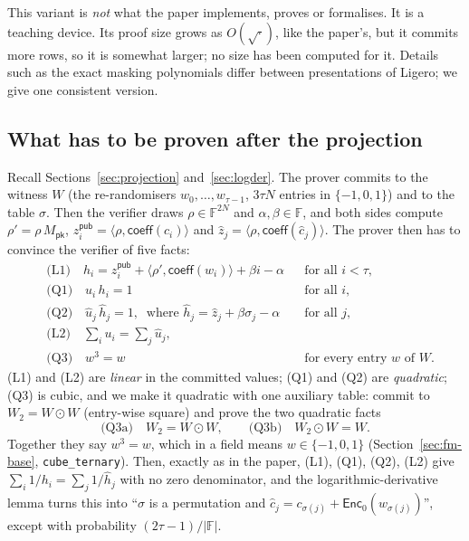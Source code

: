 \documentclass[11pt,a4paper]{article}
\newcommand{\F}{\mathbb{F}}
\newcommand{\EncZ}{\mathsf{Enc}_0}
\newcommand{\coeff}{\mathsf{coeff}}
\newcommand{\Mpk}{M_{\mathsf{pk}}}
\newcommand{\ip}[2]{\langle #1, #2\rangle}
\newcommand{\uh}{\hat{u}}
\newcommand{\hh}{\hat{h}}
\newcommand{\zh}{\hat{z}}
\newcommand{\ch}{\hat{c}}
\theoremstyle{definition}
\theoremstyle{plain}
\begin{document}
\begin{caution}[Status]
This variant is \emph{not} what the paper implements, proves or formalises. It is a teaching
device. Its proof size grows as $O(\sqrt{\cdot})$, like the paper's, but it commits more rows, so it
is somewhat larger; no size has been computed for it. Details such as the exact masking polynomials
differ between presentations of Ligero; we give one consistent version.
\end{caution}

\subsection{What has to be proven after the projection}

Recall Sections~\ref{sec:projection} and~\ref{sec:logder}. The prover commits to the witness $W$
(the re-randomisers $w_0,\dots,w_{\tau-1}$, $3\tau N$ entries in $\{-1,0,1\}$) and to the table
$\sigma$. Then the verifier draws $\rho\in\F^{2N}$ and $\alpha,\beta\in\F$, and both sides compute
$\rho'=\rho\,\Mpk$, $z^{\mathsf{pub}}_i=\ip{\rho}{\coeff(c_i)}$ and $\zh_j=\ip{\rho}{\coeff(\ch_j)}$.
The prover then has to convince the verifier of five facts:
\begin{align*}
  &\text{(L1)}\quad h_i = z^{\mathsf{pub}}_i+\ip{\rho'}{\coeff(w_i)}+\beta i-\alpha &&\text{for all } i<\tau,\\
  &\text{(Q1)}\quad u_i\,h_i=1 &&\text{for all } i,\\
  &\text{(Q2)}\quad \uh_j\,\hh_j=1,\ \text{ where }\hh_j=\zh_j+\beta\sigma_j-\alpha &&\text{for all } j,\\
  &\text{(L2)}\quad \textstyle\sum_iu_i=\sum_j\uh_j,\\
  &\text{(Q3)}\quad w^3=w &&\text{for every entry } w \text{ of } W.
\end{align*}
(L1) and (L2) are \emph{linear} in the committed values; (Q1) and (Q2) are \emph{quadratic}; (Q3)
is cubic, and we make it quadratic with one auxiliary table: commit to $W_2=W\odot W$ (entry-wise
square) and prove the two quadratic facts
\[
  \text{(Q3a)}\quad W_2=W\odot W,\qquad \text{(Q3b)}\quad W_2\odot W=W .
\]
Together they say $w^3=w$, which in a field means $w\in\{-1,0,1\}$ (Section~\ref{sec:fm-base},
\texttt{cube\_ternary}). Then, exactly as in the paper, (L1), (Q1), (Q2), (L2) give
$\sum_i1/h_i=\sum_j1/\hh_j$ with no zero denominator, and the logarithmic-derivative lemma turns this
into ``$\sigma$ is a permutation and $\ch_j=c_{\sigma(j)}+\EncZ(w_{\sigma(j)})$'', except with
probability $(2\tau-1)/|\F|$.
\end{document}
